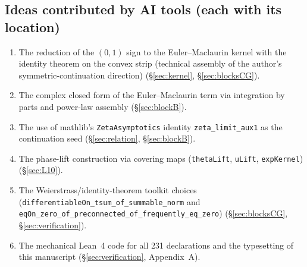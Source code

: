 \documentclass{article}
\begin{document}
\subsection*{Ideas contributed by AI tools (each with its location)}
\begin{enumerate}
\item The reduction of the $(0,1)$ sign to the Euler--Maclaurin kernel with
the identity theorem on the convex strip (technical assembly of the
author's symmetric-continuation direction) (\S\ref{sec:kernel},
\S\ref{sec:blocksCG}).
\item The complex closed form of the Euler--Maclaurin term via integration
by parts and power-law assembly (\S\ref{sec:blockB}).
\item The use of mathlib's \texttt{ZetaAsymptotics} identity
\texttt{zeta\_limit\_aux1} as the continuation seed (\S\ref{sec:relation},
\S\ref{sec:blockB}).
\item The phase-lift construction via covering maps
(\texttt{thetaLift}, \texttt{uLift}, \texttt{expKernel})
(\S\ref{sec:L10}).
\item The Weierstrass/identity-theorem toolkit choices
(\texttt{differentiableOn\_tsum\_of\_summable\_norm} and
\texttt{eqOn\_zero\_of\_preconnected\_of\_frequently\_eq\_zero})
(\S\ref{sec:blocksCG}, \S\ref{sec:verification}).
\item The mechanical Lean~4 code for all 231 declarations and the
typesetting of this manuscript (\S\ref{sec:verification}, Appendix~A).
\end{enumerate}
\end{document}
